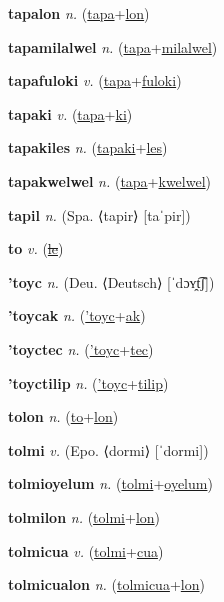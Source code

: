 \textbf{\hypertarget{tapalon}{tapalon}} \textit{n.} (\hyperlink{tapa}{tapa}+\allowbreak \hyperlink{lon}{lon})


\textbf{\hypertarget{tapamilalwel}{tapamilalwel}} \textit{n.} (\hyperlink{tapa}{tapa}+\allowbreak \hyperlink{milalwel}{milalwel})


\textbf{\hypertarget{tapafuloki}{tapafuloki}} \textit{v.} (\hyperlink{tapa}{tapa}+\allowbreak \hyperlink{fuloki}{fuloki})


\textbf{\hypertarget{tapaki}{tapaki}} \textit{v.} (\hyperlink{tapa}{tapa}+\allowbreak \hyperlink{ki}{ki})


\textbf{\hypertarget{tapakiles}{tapakiles}} \textit{n.} (\hyperlink{tapaki}{tapaki}+\allowbreak \hyperlink{les}{les})


\textbf{\hypertarget{tapakwelwel}{tapakwelwel}} \textit{n.} (\hyperlink{tapa}{tapa}+\allowbreak \hyperlink{kwelwel}{kwelwel})


\textbf{\hypertarget{tapil}{tapil}} \textit{n.} (Spa. ⟨tapir⟩ [taˈpir])


\textbf{\hypertarget{to}{to}} \textit{v.} (\hyperlink{le}{\sout{le}})


\textbf{\hypertarget{'toyc}{'toyc}} \textit{n.} (Deu. ⟨Deutsch⟩ [ˈdɔʏ̯t͡ʃ])


\textbf{\hypertarget{'toycak}{'toycak}} \textit{n.} (\hyperlink{'toyc}{'toyc}+\allowbreak \hyperlink{ak}{ak})


\textbf{\hypertarget{'toyctec}{'toyctec}} \textit{n.} (\hyperlink{'toyc}{'toyc}+\allowbreak \hyperlink{tec}{tec})


\textbf{\hypertarget{'toyctilip}{'toyctilip}} \textit{n.} (\hyperlink{'toyc}{'toyc}+\allowbreak \hyperlink{tilip}{tilip})


\textbf{\hypertarget{tolon}{tolon}} \textit{n.} (\hyperlink{to}{to}+\allowbreak \hyperlink{lon}{lon})


\textbf{\hypertarget{tolmi}{tolmi}} \textit{v.} (Epo. ⟨dormi⟩ [ˈdormi])


\textbf{\hypertarget{tolmioyelum}{tolmioyelum}} \textit{n.} (\hyperlink{tolmi}{tolmi}+\allowbreak \hyperlink{oyelum}{oyelum})


\textbf{\hypertarget{tolmilon}{tolmilon}} \textit{n.} (\hyperlink{tolmi}{tolmi}+\allowbreak \hyperlink{lon}{lon})


\textbf{\hypertarget{tolmicua}{tolmicua}} \textit{v.} (\hyperlink{tolmi}{tolmi}+\allowbreak \hyperlink{cua}{cua})


\textbf{\hypertarget{tolmicualon}{tolmicualon}} \textit{n.} (\hyperlink{tolmicua}{tolmicua}+\allowbreak \hyperlink{lon}{lon})


